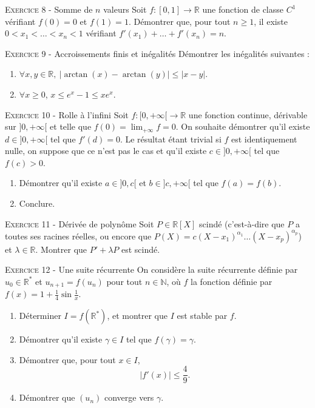

\vskip0.3cm\noindent\textsc{Exercice 8} - Somme de $n$ valeurs
\vskip0.2cm
Soit $f:[0,1]\to\mathbb R$ une fonction de classe $C^1$ vérifiant $f(0)=0$ et $f(1)=1$.
Démontrer que, pour tout $n\geq 1$, il existe $0<x_1<\dots<x_n<1$ vérifiant $f'(x_1)+\dots+f'(x_n)=n$.




\vskip0.3cm\noindent\textsc{Exercice 9} - Accroissements finis et inégalités
\vskip0.2cm
Démontrer les inégalités suivantes : 
\begin{enumerate}
\item $\forall x,y\in\mathbb R,\ |\arctan(x)-\arctan(y)|\leq |x-y|$.
\item $\forall x\geq 0$, $x\leq e^x-1\leq xe^x$.
\end{enumerate}




\vskip0.3cm\noindent\textsc{Exercice 10} - Rolle à l'infini
\vskip0.2cm
Soit $f:[0,+\infty[\to\mathbb R$ une fonction continue, dérivable sur $]0,+\infty[$ et telle que $f(0)=\lim_{+\infty}f=0$.
On souhaite démontrer qu'il existe $d\in]0,+\infty[$ tel que $f'(d)=0$. Le résultat étant trivial si $f$ est identiquement nulle, on suppose que ce n'est pas le cas et qu'il existe $c\in]0,+\infty[$ tel que $f(c)>0$.
\begin{enumerate}
\item Démontrer qu'il existe $a\in]0,c[$ et $b\in]c,+\infty[$ tel que $f(a)=f(b)$.
\item Conclure.
\end{enumerate}




\vskip0.3cm\noindent\textsc{Exercice 11} - Dérivée de polynôme
\vskip0.2cm
Soit $P\in\mathbb R[X]$ scindé (c'est-à-dire que $P$
a toutes ses racines réelles, ou encore que
$P(X)=c(X-x_1)^{\alpha_1}\dots(X-x_p)^{\alpha_p}$) et $\lambda\in\mathbb R$. Montrer que $P'+\lambda P$
est scindé.




\vskip0.3cm\noindent\textsc{Exercice 12} - Une suite récurrente
\vskip0.2cm
On considère la suite récurrente définie par $u_0\in \mathbb R^*$ et $u_{n+1}=f(u_n)$ pour tout $n\in\mathbb N$,
où $f$ la fonction définie par $f(x)=1+\frac 14\sin\frac 1x$.
\begin{enumerate}
\item Déterminer $I=f(\mathbb R^*)$, et montrer que $I$ est stable par $f$.
\item Démontrer qu'il existe $\gamma\in I$ tel que $f(\gamma)=\gamma$.
\item Démontrer que, pour tout $x\in I$, 
$$|f'(x)|\leq\frac 49.$$
\item Démontrer que $(u_n)$ converge vers $\gamma$.
\end{enumerate}


